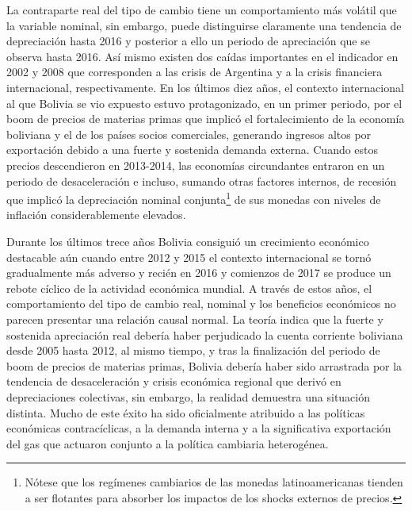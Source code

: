 \documentclass[12pt,letterpaper]{article}
\begin{document}
La contraparte real del tipo de cambio tiene un comportamiento más volátil que la variable nominal, sin embargo, puede distinguirse claramente una tendencia de depreciación hasta 2016 y posterior a ello un periodo de apreciación que se observa hasta 2016. Así mismo existen dos caídas importantes en el indicador en 2002 y 2008 que corresponden a las crisis de Argentina y a la crisis financiera internacional, respectivamente. En los últimos diez años, el contexto internacional al que Bolivia se vio expuesto estuvo protagonizado, en un primer periodo, por el boom de precios de materias primas que implicó el fortalecimiento de la economía boliviana y el de los países socios comerciales, generando ingresos altos por exportación debido a una fuerte y sostenida demanda externa. Cuando estos precios descendieron en 2013-2014, las economías circundantes entraron en un periodo de desaceleración e incluso, sumando otras factores internos, de recesión que implicó la depreciación nominal conjunta\footnote{Nótese que los regímenes cambiarios de las monedas latinoamericanas tienden a ser flotantes para absorber los impactos de los shocks externos de precios.} de sus monedas con niveles de inflación considerablemente elevados. %

Durante los últimos trece años Bolivia consiguió un crecimiento económico destacable aún cuando entre 2012 y 2015 el contexto internacional se tornó gradualmente más adverso y recién en 2016 y comienzos de 2017 se produce un rebote cíclico de la actividad económica mundial. A través de estos años, el comportamiento del tipo de cambio real, nominal y los beneficios económicos no parecen presentar una relación causal normal. La teoría indica que la fuerte y sostenida apreciación real debería haber perjudicado la cuenta corriente boliviana desde 2005 hasta 2012, al mismo tiempo, y tras la finalización del periodo de boom de precios de materias primas, Bolivia debería haber sido arrastrada por la tendencia de desaceleración y crisis económica regional que derivó en depreciaciones colectivas, sin embargo, la realidad demuestra una situación distinta. Mucho de este éxito ha sido oficialmente atribuido a las políticas económicas contracíclicas, a la demanda interna y a la significativa exportación del gas que actuaron conjunto a la política cambiaria heterogénea.
\end{document}
